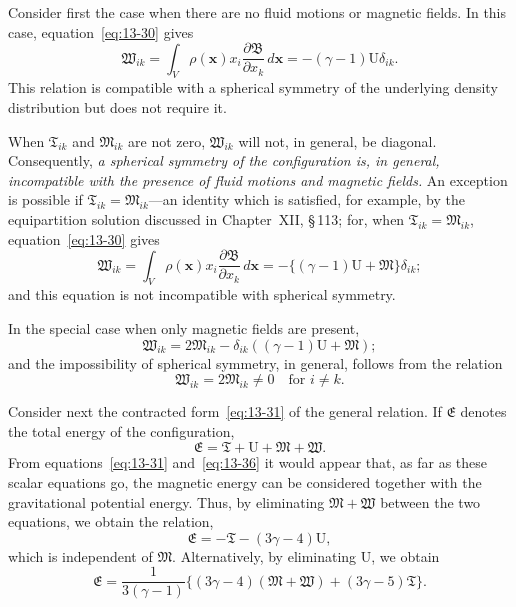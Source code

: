 Consider first the case when there are no fluid motions or magnetic fields. In this case, equation~\eqref{eq:13-30} gives
\begin{equation}
\label{eq:13-32}
\mathfrak{W}_{ik} = \int_V \rho(\mathbf{x}) x_i \frac{\partial\mathfrak{B}}{\partial x_k}\,d\mathbf{x} = -(\gamma-1)\mathrm{U}\delta_{ik}.
\end{equation}
This relation is compatible with a spherical symmetry of the underlying density distribution but does not require it.

When $\mathfrak{T}_{ik}$ and $\mathfrak{M}_{ik}$ are not zero, $\mathfrak{W}_{ik}$ will not, in general, be diagonal. Consequently, \textit{a spherical symmetry of the configuration is, in general, incompatible with the presence of fluid motions and magnetic fields.} An exception is possible if $\mathfrak{T}_{ik} = \mathfrak{M}_{ik}$---an identity which is satisfied, for example, by the equipartition solution discussed in Chapter~XII, \S\,113; for, when $\mathfrak{T}_{ik} = \mathfrak{M}_{ik}$, equation~\eqref{eq:13-30} gives
\begin{equation}
\label{eq:13-33}
\mathfrak{W}_{ik} = \int_V \rho(\mathbf{x}) x_i \frac{\partial\mathfrak{B}}{\partial x_k}\,d\mathbf{x} = -\{(\gamma-1)\mathrm{U}+\mathfrak{M}\}\delta_{ik};
\end{equation}
and this equation is not incompatible with spherical symmetry.

In the special case when only magnetic fields are present,
\begin{equation}
\label{eq:13-34}
\mathfrak{W}_{ik} = 2\mathfrak{M}_{ik} - \delta_{ik}((\gamma-1)\mathrm{U}+\mathfrak{M});
\end{equation}
and the impossibility of spherical symmetry, in general, follows from the relation
\begin{equation}
\label{eq:13-35}
\mathfrak{W}_{ik} = 2\mathfrak{M}_{ik} \neq 0 \quad \text{for } i \neq k.
\end{equation}

Consider next the contracted form~\eqref{eq:13-31} of the general relation. If $\mathfrak{E}$ denotes the total energy of the configuration,
\begin{equation}
\label{eq:13-36}
\mathfrak{E} = \mathfrak{T}+\mathrm{U}+\mathfrak{M}+\mathfrak{W}.
\end{equation}
From equations~\eqref{eq:13-31} and~\eqref{eq:13-36} it would appear that, as far as these scalar equations go, the magnetic energy can be considered together with the gravitational potential energy. Thus, by eliminating $\mathfrak{M}+\mathfrak{W}$ between the two equations, we obtain the relation,
\begin{equation}
\label{eq:13-37}
\mathfrak{E} = -\mathfrak{T}-(3\gamma-4)\mathrm{U},
\end{equation}
which is independent of $\mathfrak{M}$. Alternatively, by eliminating $\mathrm{U}$, we obtain
\begin{equation}
\label{eq:13-38}
\mathfrak{E} = \frac{1}{3(\gamma-1)}\{(3\gamma-4)(\mathfrak{M}+\mathfrak{W}) + (3\gamma-5)\mathfrak{T}\}.
\end{equation}

